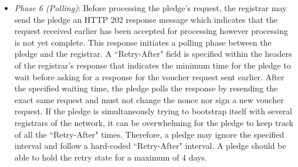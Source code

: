 \begin{itemize}
	\item \textit{Phase 6 (Polling)}: Before processing the pledge's request, the registrar may send the pledge an HTTP 202 response message which indicates that the request received earlier has been accepted for processing however processing is not yet complete. This response initiates a polling phase between the pledge and the registrar. A ``Retry-After" field is specified within the headers of the registrar's response that indicates the minimum time for the pledge to wait before asking for a response for the voucher request sent earlier. After the specified waiting time, the pledge polls the response by resending the exact same request and must not change the nonce nor sign a new voucher request. If the pledge is simultaneously trying to bootstrap itself with several registrars of the network, it can be overwhelming for the pledge to keep track of all the ``Retry-After" times. Therefore, a pledge may ignore the specified interval and follow a hard-coded ``Retry-After" interval. A pledge should be able to hold the retry state for a maximum of 4 days.
	

\end{itemize}
